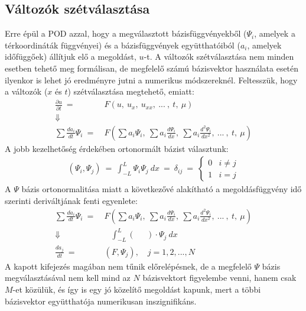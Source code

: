        \subsection*{Változók szétválasztása}
            Erre épül a POD azzal, hogy a megválasztott bázisfüggvényekből ($\varPsi_i$, amelyek a térkoordináták függvényei) és a bázisfüggvények együtthatóiból ($a_i$, amelyek időfüggőek) állítjuk elő a megoldást, $u$-t. A változók szétválasztása nem minden esetben tehető meg formálisan, de megfelelő számú bázisvektor használata esetén ilyenkor is lehet jó eredményre jutni a numerikus módszereknél. Feltesszük, hogy a változók ($x$ és $t$) szétválasztása megtehető, emiatt:
            \begin{align*}
                \frac{\partial u}{\partial t}~= &~F(u,~u_x,~u_{xx},~...~,~t,~\mu) \\
                \Downarrow & \\
                \sum \frac{d a_{i}}{d t} \varPsi_{i}~= &~F\left(\sum a_{i} \varPsi_{i},~\sum a_{i} \frac{d\varPsi_{i}}{dx},~\sum a_{i} \frac{d^2\varPsi_{i}}{dx^2},~...~,~t,~\mu\right)
            \end{align*}
            A jobb kezelhetőség érdekében ortonormált bázist választunk:
            \begin{align*}
                \left( \varPsi_{i},\varPsi_{j}  \right)~=~\int_{-L}^{L}\varPsi_{i} \varPsi_{j}  ~dx~=~\delta_{ij}~=~
                \begin{cases}
                    0 & i \ne j \\
                    1 & i = j
                \end{cases}
            \end{align*}
            A $\varPsi$ bázis ortonormalitása miatt a következővé alakítható a megoldásfüggvény idő szerinti deriváltjának fenti egyenlete:
            \begin{align*}
                \sum \frac{d a_{i}}{d t} \varPsi_{i}~=&~F\left(\sum a_{i} \varPsi_{i},~\sum a_{i} \frac{d\varPsi_{i}}{dx},~\sum a_{i} \frac{d^2\varPsi_{i}}{dx^2},~...~,~t,~\mu\right) \\
                \Downarrow & \quad \int_{-L}^{L} (\phantom{abc})\cdot \varPsi_{j}~dx \\
                \frac{d a_{j}}{d t}~=&~\left( F, \varPsi_{j} \right), \quad j = 1,2,...,N
            \end{align*}
            A kapott kifejezés magában nem tűnik előrelépésnek, de a megfelelő $\varPsi$ bázis megválasztásával nem kell mind az $N$ bázisvektort figyelembe venni, hanem csak $M$-et közülük, és így is egy jó közelítő megoldást kapunk, mert a többi bázisvektor együtthatója numerikusan inszignifikáns.
